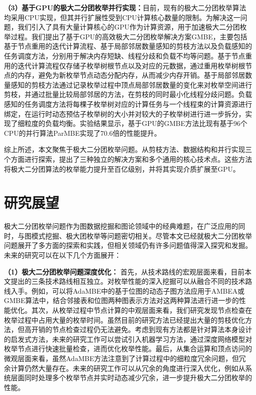 \textbf{（3）基于GPU的极大二分团枚举并行实现：}目前，现有的极大二分团枚举算法均采用CPU实现，但其并行扩展性受到CPU计算核心数量的限制。为解决这一问题，我们引入了具有大量计算核心的GPU作为计算资源，用于加速极大二分团枚举过程。我们提出了基于GPU的高效极大二分团枚举解决方案GMBE，主要包括基于节点重用的迭代计算流程、基于局部邻居数量感知的剪枝方法以及负载感知的任务调度方法，分别用于解决内存短缺、线程分歧和负载不均等问题。基于节点重用的迭代计算流程仅存储子枚举树根节点以及对应的元数据，通过重用枚举树根节点的内存，避免为新枚举节点动态分配内存，从而减少内存开销。基于局部邻居数量感知的剪枝方法通过记录枚举过程中顶点局部邻居数量的变化来对枚举空间进行剪枝，并通过批量比较局部邻居的方法，在剪枝的同时最小化线程分歧问题。负载感知的任务调度方法将每棵子枚举树对应的计算任务与一个线程束的计算资源进行绑定，在运行时动态预估子枚举树的大小并对较大的子枚举树进行进一步拆分，实现了细粒度的负载均衡。实验结果显示，基于GPU的GMBE方法比现有基于96个CPU的并行算法ParMBE实现了70.6倍的性能提升。

综上所述，本文聚焦于极大二分团枚举问题。从剪枝方法、数据结构和并行实现三个方面进行探索，提出了三种独立的解决方案和多个通用的核心技术点。这些方法将极大二分团算法的枚举能力提升至百亿级别，并将其实现介质扩展至GPU。

\section{研究展望}

极大二分团枚举问题作为图数据挖掘和图论领域中的经典难题，在广泛应用的同时，与图模式挖掘、极大团枚举等问题密切相关。尽管本文已经就极大二分团枚举问题展开了多方面的探索和实践，但相关领域仍有许多问题值得深入探究和发掘。未来的研究可以在以下几个方面展开：

\textbf{（1）极大二分团枚举问题深度优化：} 首先，从技术路线的宏观层面来看，目前本文提出的三条技术路线相互独立。对枚举性能的深入挖掘可以从融合不同的技术路线入手。例如，可以将AdaMBE中的基于位图的动态子图方法应用于AMBEA或GMBE算法中，结合邻接表和位图两种图表示方法对这两种算法进行进一步的性能优化。其次，从枚举过程中节点计算的中观层面来看，我们研究发现节点检查在枚举过程中占用大量的枚举时间。虽然目前的研究方法已经提出大量的剪枝优化方法，但高开销的节点检查过程仍无法避免。考虑到现有方法都是针对算法本身设计的启发式方法，未来的研究工作可以尝试引入机器学习方法，通过深度网络模型对枚举节点进行快速批量检查，进而优化枚举性能。最后，从集合运算和顶点访问的微观层面来看，虽然AdaMBE方法注意到了计算过程中的细粒度冗余问题，但冗余计算仍然大量存在。未来的研究工作可以从冗余的角度进行深入优化，例如从系统层面同时处理多个枚举节点并实时动态减少冗余，进一步提升极大二分团枚举的性能。

